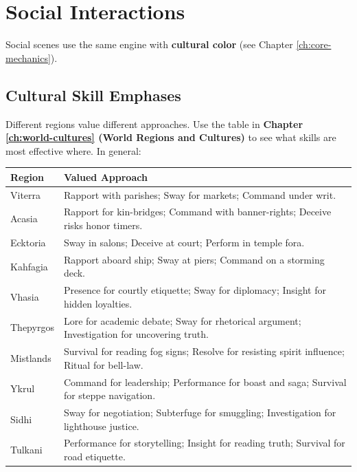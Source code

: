 \section{Social Interactions}
\label{sec:social-interactions}
Social scenes use the same engine with \textbf{cultural color} (see Chapter \ref{ch:core-mechanics}).

\subsection*{Cultural Skill Emphases}
\label{sec:cultural-skills}
Different regions value different approaches. Use the table in \textbf{Chapter \ref{ch:world-cultures} (World Regions and Cultures)} to see what skills are most effective where. In general:

\begin{center}
\begin{longtable}{ll}
\toprule
\textbf{Region} & \textbf{Valued Approach} \\
\midrule
Viterra & Rapport with parishes; Sway for markets; Command under writ. \\
Acasia & Rapport for kin-bridges; Command with banner-rights; Deceive risks honor timers. \\
Ecktoria & Sway in salons; Deceive at court; Perform in temple fora. \\
Kahfagia & Rapport aboard ship; Sway at piers; Command on a storming deck. \\
Vhasia & Presence for courtly etiquette; Sway for diplomacy; Insight for hidden loyalties. \\
Thepyrgos & Lore for academic debate; Sway for rhetorical argument; Investigation for uncovering truth. \\
Mistlands & Survival for reading fog signs; Resolve for resisting spirit influence; Ritual for bell-law. \\
Ykrul & Command for leadership; Performance for boast and saga; Survival for steppe navigation. \\
Sidhi & Sway for negotiation; Subterfuge for smuggling; Investigation for lighthouse justice. \\
Tulkani & Performance for storytelling; Insight for reading truth; Survival for road etiquette. \\
\bottomrule
\end{longtable}
\end{center}

